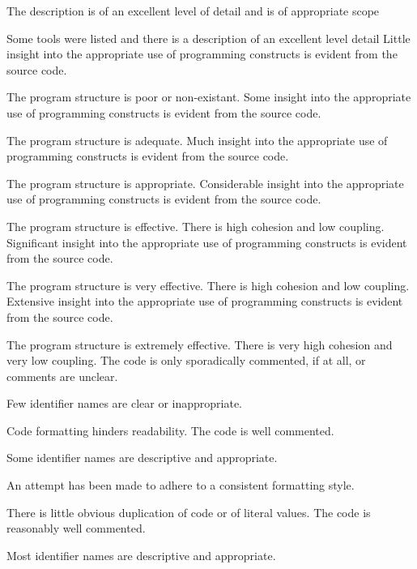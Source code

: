 \documentclass{../../fal_assignment}
\begin{document}
\begin{markingrubric}
        \grade The description is of an excellent level of detail and is of appropriate scope
            \par  Some tools were listed and there is a description of an excellent level detail
%
        \grade \fail Little insight into the appropriate use of programming constructs is evident from the source code.
            \par The program structure is poor or non-existant.
        \grade Some insight into the appropriate use of programming constructs is evident from the source code.
            \par The program structure is adequate.
        \grade Much insight into the appropriate use of programming constructs is evident from the source code.
            \par The program structure is appropriate.
        \grade Considerable insight into the appropriate use of programming constructs is evident from the source code.
            \par The program structure is effective. There is high cohesion and low coupling.
        \grade Significant insight into the appropriate use of programming constructs is evident from the source code.
            \par The program structure is very effective. There is high cohesion and low coupling.
        \grade Extensive insight into the appropriate use of programming constructs is evident from the source code.
            \par The program structure is extremely effective. There is very high cohesion and very low coupling.
%
        \grade \fail The code is only sporadically commented, if at all, or comments are unclear.
            \par Few identifier names are clear or inappropriate.
            \par Code formatting hinders readability.
        \grade The code is well commented.
            \par Some identifier names are descriptive and appropriate.
            \par An attempt has been made to adhere to a consistent formatting style.
             \par There is little obvious duplication of code or of literal values.           
        \grade The code is reasonably well commented.
            \par Most identifier names are descriptive and appropriate.

\end{markingrubric}
\end{document}
